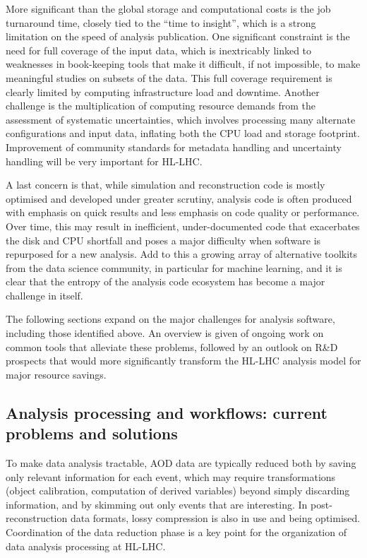 \documentclass[10pt,a4paper]{article}
\begin{document}
More significant than the global storage and computational costs is the
job turnaround time, closely tied to the ``time to insight'', which is a
strong limitation on the speed of analysis publication. One significant
constraint is the need for full coverage of the input data, which is
inextricably linked to weaknesses in book-keeping tools that make it
difficult, if not impossible, to make meaningful studies on subsets of
the data. This full coverage requirement is clearly limited by computing
infrastructure load and downtime. Another challenge is the
multiplication of computing resource demands from the assessment of
systematic uncertainties, which involves processing many alternate
configurations and input data, inflating both the CPU load and storage
footprint. Improvement of community standards for metadata handling and
uncertainty handling will be very important for HL-LHC.

A last concern is that, while simulation and reconstruction code is
mostly optimised and developed under greater scrutiny, analysis code is
often produced with emphasis on quick results and less emphasis on code
quality or performance. Over time, this may result in inefficient,
under-documented code that exacerbates the disk and CPU shortfall and
poses a major difficulty when software is repurposed for a new analysis.
Add to this a growing array of alternative toolkits from the data
science community, in particular for machine learning, and it is clear
that the entropy of the analysis code ecosystem has become a major
challenge in itself.

The following sections expand on the major challenges for analysis
software, including those identified above. An overview is given of
ongoing work on common tools that alleviate these problems, followed by
an outlook on R\&D prospects that would more significantly transform the
HL-LHC analysis model for major resource savings.

\hypertarget{analysis-processing-and-workflows-current-problems-and-solutions}{%
\subsection{Analysis processing and workflows: current problems and
solutions}\label{analysis-processing-and-workflows-current-problems-and-solutions}}

To make data analysis tractable, AOD data are typically reduced both by
saving only relevant information for each event, which may require
transformations (object calibration, computation of derived variables)
beyond simply discarding information, and by skimming out only events
that are interesting. In post-reconstruction data formats, lossy
compression is also in use and being optimised. Coordination of the data
reduction phase is a key point for the organization of data analysis
processing at HL-LHC.
\end{document}
